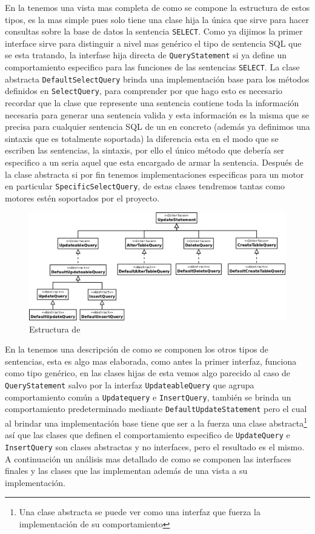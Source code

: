 En la  tenemos una vista mas completa de como se compone la estructura de estos tipos, es la mas simple pues solo tiene una clase hija la única que sirve para hacer consultas sobre la base de datos la sentencia \verb=SELECT=. Como ya dijimos la primer interface sirve para distinguir a nivel mas genérico el tipo de sentencia SQL que se esta tratando, la interfase hija directa de \verb=QueryStatement= si ya define un comportamiento especifico para las funciones de las sentencias \verb=SELECT=. La clase abstracta \verb=DefaultSelectQuery= brinda una implementación base para los métodos definidos en \verb=SelectQuery=, para comprender por que hago esto es necesario recordar que la clase que represente una sentencia contiene toda la información necesaria para generar una sentencia valida y esta información es la misma que se precisa para cualquier sentencia SQL de un \dd en concreto (además ya definimos una sintaxis que es totalmente soportada) la diferencia esta en el modo que se escriben las sentencias, la sintaxis, por ello el único método que debería ser especifico a un \dd seria aquel que esta encargado de armar la sentencia. Después de la clase abstracta si por fin tenemos implementaciones especificas para un motor en particular \verb=SpecificSelectQuery=, de estas clases tendremos tantas como motores estén soportados por el proyecto.\\

\begin{figure}
  \centering
    \includegraphics[width=\textwidth]{figuras/crossdb-update.png}
  \caption{Estructura de}
  \label{fig:update}
\end{figure}

En la  tenemos una descripción de como se componen los otros tipos de sentencias, esta es algo mas elaborada, como antes la primer interfaz, funciona como tipo genérico, en las clases hijas de esta vemos algo parecido al caso de \verb=QueryStatement= salvo por la interfaz \verb=UpdateableQuery= que agrupa comportamiento común a \verb=Updatequery= e \verb=InsertQuery=, también se brinda un comportamiento predeterminado mediante \verb=DefaultUpdateStatement= pero el cual al brindar una implementación base tiene que ser a la fuerza una clase abstracta\footnote{Una clase abstracta se puede ver como una interfaz que fuerza la implementación de su comportamiento} así que las clases que definen el comportamiento especifico de \verb=UpdateQuery= e \verb=InsertQuery= son clases abstractas y no interfaces, pero el resultado es el mismo. A continuación un análisis mas detallado de como se componen las interfaces finales y las clases que las implementan además de una vista a su implementación.




